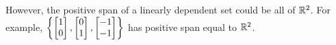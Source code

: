 \begin{enumerate}
\begin{enumerate}
					However, the positive span of a linearly dependent set could be all of $\mathbb{R}^2$. For example, $\left\{
						\begin{bmatrix}1\\0\end{bmatrix},\begin{bmatrix}0\\1\end{bmatrix},\begin{bmatrix}-1\\-1\end{bmatrix}\right\}$ has positive span equal to $\mathbb{R}^2$.
			\end{enumerate}
		\end{enumerate}
